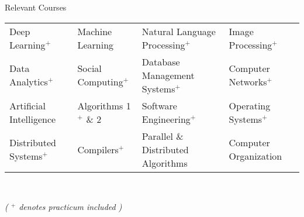 \documentclass{resume} %
\begin{document}
\begin{rSection}{Relevant Courses}
\begin{tabular}{p{3.7cm} p{3.5cm} p{5.7cm} p{4.1cm}}
Deep Learning$^+$ & Machine Learning & Natural Language Processing$^+$ & Image Processing$^+$ \\
Data Analytics$^+$ & Social Computing$^+$ & Database Management Systems$^+$ & Computer Networks$^+$  \\
Artificial Intelligence & Algorithms 1$^+$ \& 2 & Software Engineering$^+$ & Operating Systems$^+$ \\
Distributed Systems$^+$ & Compilers$^+$ & Parallel \& Distributed Algorithms & Computer Organization\\
\end{tabular}\\
\centerline{\footnotesize \textit{ ( $^+$ denotes practicum included )  }}
\end{rSection}

\end{document}
